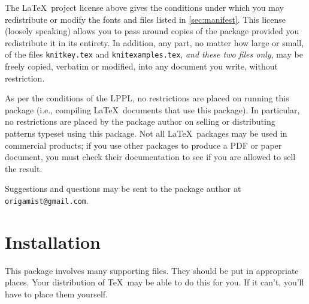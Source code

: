 \documentclass[draft]{amsart}
\begin{document}
The \LaTeX\ project license above gives the conditions under which you
may redistribute or modify the fonts and files listed in
\autoref{sec:manifest}. This license (loosely speaking) allows you to
pass around copies of the package provided you redistribute it in its
entirety. In addition, any part, no matter how large or small, of the
files \texttt{knitkey.tex} and \texttt{knitexamples.tex}, \emph{and
these two files only}, may be freely copied, verbatim or modified, into
any document you write, without restriction.

As per the conditions of the LPPL, no restrictions are placed on running
this package (i.e., compiling \LaTeX\ documents that use this package).
In particular, no restrictions are placed by the package author on
selling or distributing patterns typeset using this package. Not
all \LaTeX\ packages may be used in commercial products; if you use
other packages to produce a PDF or paper document, you must check their
documentation to see if you are allowed to sell the result.

Suggestions and questions may be sent to the package author at
\texttt{origamist@\allowbreak gmail.com}.

\section{Installation}

This package involves many supporting files. They should be put in
appropriate places. Your distribution of \TeX\ may be able to do this
for you. If it can't, you'll have to place them yourself.
\end{document}
